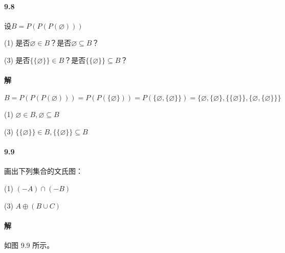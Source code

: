 \documentclass[UTF8]{ctexart}
\begin{document}
\paragraph{9.8}\label{9.8}
设$B = P(P(P(\varnothing)))$

(1) 是否$\varnothing \in B$？是否$\varnothing \subseteq B$？

(3) 是否$\{\{\varnothing \}\}\in B$？是否$\{\{\varnothing \}\} \subseteq B$？

\paragraph{解}
$$ B = P(P(P(\varnothing))) = P(P( \{ \varnothing \} )) = P( \{ \varnothing, \{ \varnothing \} \} ) = \{ \varnothing, \{ \varnothing \} , \{ \{ \varnothing \} \} , \{ \varnothing, \{ \varnothing \} \} \} $$

(1) $ \varnothing \in B, \varnothing\subseteq B $

(3) $ \{ \{ \varnothing \} \} \in B, \{ \{ \varnothing \} \} \subseteq B $
\paragraph{9.9}\label{9.9}
画出下列集合的文氏图：

(1) $(-A) \cap (-B)$

(3) $A \oplus (B \cup C)$

\paragraph{解} 如图 9.9 所示。
\end{document}
